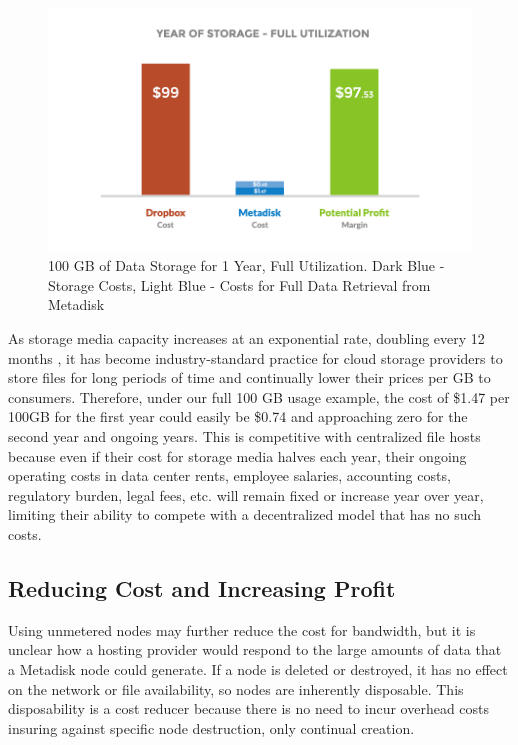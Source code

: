 \documentclass[a4paper,10pt]{article}
\begin{document}
\begin{figure}[h!]
  \centering
      \includegraphics[width=\linewidth]{04}
  \caption{100 GB of Data Storage for 1 Year, Full Utilization. Dark Blue - Storage Costs, Light Blue - Costs for Full Data Retrieval from Metadisk}
\end{figure}


As storage media capacity increases at an exponential rate, doubling every 12 months \cite{17}, it has become industry-standard practice for cloud storage providers to store files for long periods of time and continually lower their prices per GB to consumers. Therefore, under our full 100 GB usage example, the cost of \$1.47 per 100GB for the first year could easily be \$0.74 and approaching zero for the second year and ongoing years. This is competitive with centralized file hosts because even if their cost for storage media halves each year, their ongoing operating costs in data center rents, employee salaries, accounting costs, regulatory burden, legal fees, etc. will remain fixed or increase year over year, limiting their ability to compete with a decentralized model that has no such costs.

\subsection{Reducing Cost and Increasing Profit}

Using unmetered nodes may further reduce the cost for bandwidth, but it is unclear how a hosting provider would respond to the large amounts of data that a Metadisk node could generate. If a node is deleted or destroyed, it has no effect on the network or file availability, so nodes are inherently disposable. This disposability is a cost reducer because there is no need to incur overhead costs insuring against specific node destruction, only continual creation. \\
\end{document}
